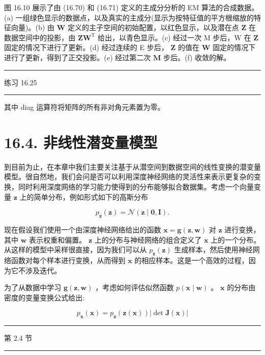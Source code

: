 \documentclass[10pt]{report}
\newcommand{\HRule}{\begin{center}\rule{0.9\linewidth}{0.2mm}\end{center}}
\begin{document}
图 16.10 展示了由 (16.70) 和 (16.71) 定义的主成分分析的 EM 算法的合成数据。(a) 一组绿色显示的数据点，以及真实的主成分(显示为按特征值的平方根缩放的特征向量)。(b) 由 \(\mathbf{W}\) 定义的主子空间的初始配置，以红色显示，以及潜在点 \(\mathbf{Z}\) 在数据空间中的投影，由 \(\mathbf{Z}{\mathbf{W}}^{\mathrm{T}}\) 给出，以青色显示。(c) 经过一次 M 步后，W 在 \(\mathbf{Z}\) 固定的情况下进行了更新。(d) 经过连续的 E 步后， \(\mathbf{Z}\) 的值在 \(\mathbf{W}\) 固定的情况下进行了更新，得到了正交投影。(e) 经过第二次 \(\mathbf{M}\) 步后。(f) 收敛的解。

\HRule

练习 16.25

\HRule

其中 diag 运算符将矩阵的所有非对角元素置为零。

\section*{16.4. 非线性潜变量模型}

到目前为止，在本章中我们主要关注基于从潜空间到数据空间的线性变换的潜变量模型。很自然地，我们会问是否可以利用深度神经网络的灵活性来表示更复杂的变换，同时利用深度网络的学习能力使得到的分布能够拟合数据集。考虑一个向量变量 \(\mathbf{z}\) 上的简单分布，例如形式如下的高斯分布

\[
{p}_{\mathbf{z}}\left( \mathbf{z}\right)  = \mathcal{N}\left( {\mathbf{z} \mid  \mathbf{0},\mathbf{I}}\right) . \tag{16.77}
\]

现在假设我们使用一个由深度神经网络给出的函数 \(\mathbf{x} = \mathbf{g}\left( {\mathbf{z},\mathbf{w}}\right)\) 对 \(\mathbf{z}\) 进行变换，其中 \(\mathbf{w}\) 表示权重和偏置。 \(\mathbf{z}\) 上的分布与神经网络的组合定义了 \(\mathbf{x}\) 上的一个分布。从这样的模型中采样很直接，因为我们可以从 \({p}_{\mathbf{z}}\left( \mathbf{z}\right)\) 生成样本，然后使用神经网络函数对每个样本进行变换，从而得到 \(\mathbf{x}\) 的相应样本。这是一个高效的过程，因为它不涉及迭代。

为了从数据中学习 \(\mathbf{g}\left( {\mathbf{z},\mathbf{w}}\right)\) ，考虑如何评估似然函数 \(p\left( {\mathbf{x} \mid  \mathbf{w}}\right)\) 。 \(\mathbf{x}\) 的分布由密度的变量变换公式给出:

\[
{p}_{\mathbf{x}}\left( \mathbf{x}\right)  = {p}_{\mathbf{z}}\left( {\mathbf{z}\left( \mathbf{x}\right) }\right) \left| {\det \mathbf{J}\left( \mathbf{x}\right) }\right|  \tag{16.78}
\]

\HRule

第 2.4 节

\HRule
\end{document}
